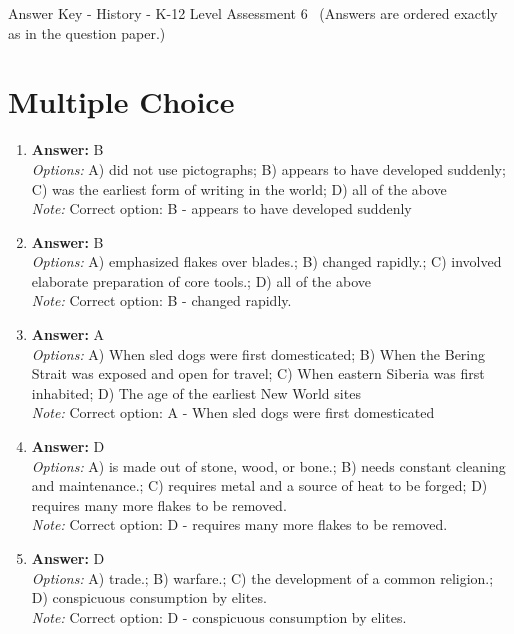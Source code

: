\documentclass[12pt]{article}
\begin{document}
\begin{center}
Answer Key - History - K-12 Level Assessment 6 \
\small (Answers are ordered exactly as in the question paper.)
\end{center}

\section*{Multiple Choice}
\begin{enumerate}[label=\arabic*.]
\item \textbf{Answer:} B
\\ \textit{Options:} A) did not use pictographs; B) appears to have developed suddenly; C) was the earliest form of writing in the world; D) all of the above
\\ \textit{Note:} Correct option: B - appears to have developed suddenly
\item \textbf{Answer:} B
\\ \textit{Options:} A) emphasized flakes over blades.; B) changed rapidly.; C) involved elaborate preparation of core tools.; D) all of the above
\\ \textit{Note:} Correct option: B - changed rapidly.
\item \textbf{Answer:} A
\\ \textit{Options:} A) When sled dogs were first domesticated; B) When the Bering Strait was exposed and open for travel; C) When eastern Siberia was first inhabited; D) The age of the earliest New World sites
\\ \textit{Note:} Correct option: A - When sled dogs were first domesticated
\item \textbf{Answer:} D
\\ \textit{Options:} A) is made out of stone, wood, or bone.; B) needs constant cleaning and maintenance.; C) requires metal and a source of heat to be forged; D) requires many more flakes to be removed.
\\ \textit{Note:} Correct option: D - requires many more flakes to be removed.
\item \textbf{Answer:} D
\\ \textit{Options:} A) trade.; B) warfare.; C) the development of a common religion.; D) conspicuous consumption by elites.
\\ \textit{Note:} Correct option: D - conspicuous consumption by elites.
\end{enumerate}
\end{document}
